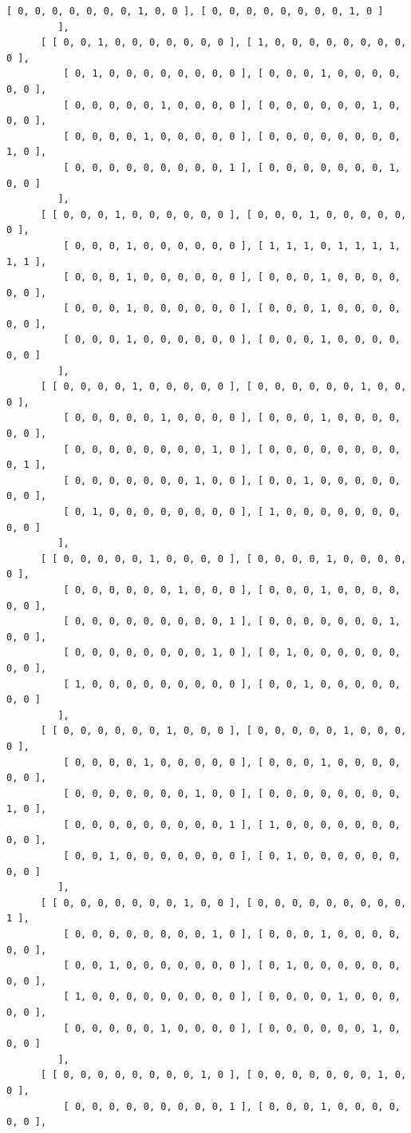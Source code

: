 \documentclass[a4paper, 10pt]{book}
\theoremstyle{definition}
\numberwithin{equation}{chapter}
\begin{document}
\begin{appendices}
\begin{enumerate}
\begin{lstlisting}[numbers=none]
          [ 0, 0, 0, 0, 0, 0, 0, 1, 0, 0 ], [ 0, 0, 0, 0, 0, 0, 0, 0, 1, 0 ] 
         ], 
      [ [ 0, 0, 1, 0, 0, 0, 0, 0, 0, 0 ], [ 1, 0, 0, 0, 0, 0, 0, 0, 0, 0 ], 
          [ 0, 1, 0, 0, 0, 0, 0, 0, 0, 0 ], [ 0, 0, 0, 1, 0, 0, 0, 0, 0, 0 ],
          [ 0, 0, 0, 0, 0, 1, 0, 0, 0, 0 ], [ 0, 0, 0, 0, 0, 0, 1, 0, 0, 0 ],
          [ 0, 0, 0, 0, 1, 0, 0, 0, 0, 0 ], [ 0, 0, 0, 0, 0, 0, 0, 0, 1, 0 ],
          [ 0, 0, 0, 0, 0, 0, 0, 0, 0, 1 ], [ 0, 0, 0, 0, 0, 0, 0, 1, 0, 0 ] 
         ], 
      [ [ 0, 0, 0, 1, 0, 0, 0, 0, 0, 0 ], [ 0, 0, 0, 1, 0, 0, 0, 0, 0, 0 ], 
          [ 0, 0, 0, 1, 0, 0, 0, 0, 0, 0 ], [ 1, 1, 1, 0, 1, 1, 1, 1, 1, 1 ],
          [ 0, 0, 0, 1, 0, 0, 0, 0, 0, 0 ], [ 0, 0, 0, 1, 0, 0, 0, 0, 0, 0 ],
          [ 0, 0, 0, 1, 0, 0, 0, 0, 0, 0 ], [ 0, 0, 0, 1, 0, 0, 0, 0, 0, 0 ],
          [ 0, 0, 0, 1, 0, 0, 0, 0, 0, 0 ], [ 0, 0, 0, 1, 0, 0, 0, 0, 0, 0 ] 
         ], 
      [ [ 0, 0, 0, 0, 1, 0, 0, 0, 0, 0 ], [ 0, 0, 0, 0, 0, 0, 1, 0, 0, 0 ], 
          [ 0, 0, 0, 0, 0, 1, 0, 0, 0, 0 ], [ 0, 0, 0, 1, 0, 0, 0, 0, 0, 0 ],
          [ 0, 0, 0, 0, 0, 0, 0, 0, 1, 0 ], [ 0, 0, 0, 0, 0, 0, 0, 0, 0, 1 ],
          [ 0, 0, 0, 0, 0, 0, 0, 1, 0, 0 ], [ 0, 0, 1, 0, 0, 0, 0, 0, 0, 0 ],
          [ 0, 1, 0, 0, 0, 0, 0, 0, 0, 0 ], [ 1, 0, 0, 0, 0, 0, 0, 0, 0, 0 ] 
         ], 
      [ [ 0, 0, 0, 0, 0, 1, 0, 0, 0, 0 ], [ 0, 0, 0, 0, 1, 0, 0, 0, 0, 0 ], 
          [ 0, 0, 0, 0, 0, 0, 1, 0, 0, 0 ], [ 0, 0, 0, 1, 0, 0, 0, 0, 0, 0 ],
          [ 0, 0, 0, 0, 0, 0, 0, 0, 0, 1 ], [ 0, 0, 0, 0, 0, 0, 0, 1, 0, 0 ],
          [ 0, 0, 0, 0, 0, 0, 0, 0, 1, 0 ], [ 0, 1, 0, 0, 0, 0, 0, 0, 0, 0 ],
          [ 1, 0, 0, 0, 0, 0, 0, 0, 0, 0 ], [ 0, 0, 1, 0, 0, 0, 0, 0, 0, 0 ] 
         ], 
      [ [ 0, 0, 0, 0, 0, 0, 1, 0, 0, 0 ], [ 0, 0, 0, 0, 0, 1, 0, 0, 0, 0 ], 
          [ 0, 0, 0, 0, 1, 0, 0, 0, 0, 0 ], [ 0, 0, 0, 1, 0, 0, 0, 0, 0, 0 ],
          [ 0, 0, 0, 0, 0, 0, 0, 1, 0, 0 ], [ 0, 0, 0, 0, 0, 0, 0, 0, 1, 0 ],
          [ 0, 0, 0, 0, 0, 0, 0, 0, 0, 1 ], [ 1, 0, 0, 0, 0, 0, 0, 0, 0, 0 ],
          [ 0, 0, 1, 0, 0, 0, 0, 0, 0, 0 ], [ 0, 1, 0, 0, 0, 0, 0, 0, 0, 0 ] 
         ], 
      [ [ 0, 0, 0, 0, 0, 0, 0, 1, 0, 0 ], [ 0, 0, 0, 0, 0, 0, 0, 0, 0, 1 ], 
          [ 0, 0, 0, 0, 0, 0, 0, 0, 1, 0 ], [ 0, 0, 0, 1, 0, 0, 0, 0, 0, 0 ],
          [ 0, 0, 1, 0, 0, 0, 0, 0, 0, 0 ], [ 0, 1, 0, 0, 0, 0, 0, 0, 0, 0 ],
          [ 1, 0, 0, 0, 0, 0, 0, 0, 0, 0 ], [ 0, 0, 0, 0, 1, 0, 0, 0, 0, 0 ],
          [ 0, 0, 0, 0, 0, 1, 0, 0, 0, 0 ], [ 0, 0, 0, 0, 0, 0, 1, 0, 0, 0 ] 
         ], 
      [ [ 0, 0, 0, 0, 0, 0, 0, 0, 1, 0 ], [ 0, 0, 0, 0, 0, 0, 0, 1, 0, 0 ], 
          [ 0, 0, 0, 0, 0, 0, 0, 0, 0, 1 ], [ 0, 0, 0, 1, 0, 0, 0, 0, 0, 0 ],

\end{lstlisting}
\end{enumerate}
\end{appendices}
\end{document}
